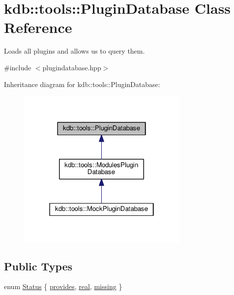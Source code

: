 \hypertarget{classkdb_1_1tools_1_1PluginDatabase}{}\section{kdb\+:\+:tools\+:\+:Plugin\+Database Class Reference}
\label{classkdb_1_1tools_1_1PluginDatabase}


Loads all plugins and allows us to query them.  




{\ttfamily \#include $<$plugindatabase.\+hpp$>$}



Inheritance diagram for kdb\+:\+:tools\+:\+:Plugin\+Database\+:
\nopagebreak
\begin{figure}[H]
\begin{center}
\leavevmode
\includegraphics[width=238pt]{classkdb_1_1tools_1_1PluginDatabase__inherit__graph}
\end{center}
\end{figure}
\subsection*{Public Types}
\begin{DoxyCompactItemize}
\item 
enum \hyperlink{classkdb_1_1tools_1_1PluginDatabase_afc91ff760616ee83c6afb70e5a2f0601}{Status} \{ \hyperlink{classkdb_1_1tools_1_1PluginDatabase_afc91ff760616ee83c6afb70e5a2f0601a73ff10d6a07213c277db4326b3df6c4b}{provides}, 
\hyperlink{classkdb_1_1tools_1_1PluginDatabase_afc91ff760616ee83c6afb70e5a2f0601a2b7279a50ed80231a60b0435340c31a8}{real}, 
\hyperlink{classkdb_1_1tools_1_1PluginDatabase_afc91ff760616ee83c6afb70e5a2f0601ae789aaff1847ebb77eecb027c5ee0401}{missing}
 \}
\end{DoxyCompactItemize}
